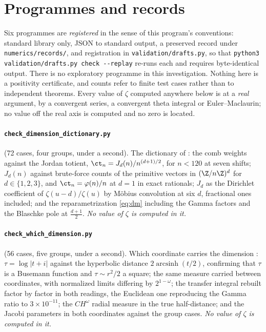 \section{Programmes and records}\label{app:numerics}

Six programmes are \emph{registered} in the sense of this program's conventions:
standard library only, JSON to standard output, a preserved record under
\texttt{numerics/records/}, and registration in
\texttt{validation/drafts.py}, so that
\texttt{python3 validation/drafts.py check -{}-replay} re-runs each and requires
byte-identical output. There is no exploratory programme in this investigation.
Nothing here is a positivity certificate, and counts refer to finite test cases
rather than to independent theorems. Every value of $\zeta$ computed anywhere
below is at a \emph{real} argument, by a convergent series, a convergent theta
integral or Euler--Maclaurin; no value off the real axis is computed and no zero
is located.

\paragraph{\texttt{check\_dimension\_dictionary.py}} (72 cases, four groups,
under a second). The dictionary of \cite{OpeningNote}: the comb weights against
the Jordan totient, $\ct_n=J_d(n)/n^{(d+1)/2}$, for $n<120$ at seven shifts;
$J_d(n)$ against brute-force counts of the primitive vectors in
$(\Z/n\Z)^{d}$ for $d\in\{1,2,3\}$, and $\ct_n=\varphi(n)/n$ at $d=1$ in exact
rationals; $J_d$ as the Dirichlet coefficient of $\zeta(u-d)/\zeta(u)$ by
M\"obius convolution at six $d$, fractional ones included; and the
reparametrization \eqref{eq:dm} including the Gamma factors and the Blaschke pole
at $\frac{d+1}2$. \emph{No value of $\zeta$ is computed in it.}

\paragraph{\texttt{check\_which\_dimension.py}} (56 cases, five groups, under a
second). Which coordinate carries the dimension \cite{WhichDimension}:
$\tau=\log\lvert t+i\rvert$ against the hyperbolic distance $2\operatorname{arcsinh}(t/2)$,
confirming that $\tau$ is a Busemann function and $\tau\sim r^{2}/2$ a square;
the same measure carried between coordinates, with normalized limits differing by
$2^{1-\omega}$; the transfer integral rebuilt factor by factor in both readings,
the Euclidean one reproducing the Gamma ratio to $3\times10^{-11}$; the
$CH^{\omega}$ radial measure in the true half-distance; and the Jacobi
parameters in both coordinates against the group cases. \emph{No value of $\zeta$
is computed in it.}

